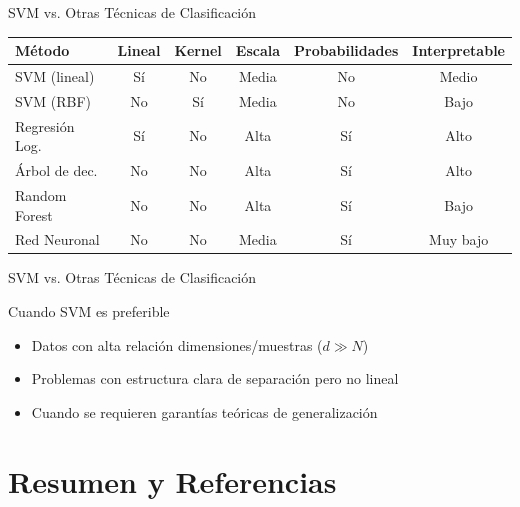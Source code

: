 \documentclass[aspectratio=169,xcolor=dvipsnames]{beamer}
\begin{document}
\begin{frame}{SVM vs. Otras Técnicas de Clasificación}
    \begin{center}
    \begin{tabular}{lccccc}
        \toprule
        \textbf{Método} & \textbf{Lineal} & \textbf{Kernel} & \textbf{Escala} & \textbf{Probabilidades} & \textbf{Interpretable} \\
        \midrule
        SVM (lineal)    & Sí & No  & Media  & No  & Medio \\
        SVM (RBF)       & No & Sí  & Media  & No  & Bajo \\
        Regresión Log.  & Sí & No  & Alta   & Sí  & Alto \\
        Árbol de dec.   & No & No  & Alta   & Sí  & Alto \\
        Random Forest   & No & No  & Alta   & Sí  & Bajo \\
        Red Neuronal    & No & No  & Media  & Sí  & Muy bajo \\
        \bottomrule
    \end{tabular}
    \end{center}
\end{frame}
\begin{frame}{SVM vs. Otras Técnicas de Clasificación}

    \begin{exampleblock}{Cuando SVM es preferible}
        \begin{itemize}
            \item Datos con alta relación dimensiones/muestras ($d \gg N$)
            \item Problemas con estructura clara de separación pero no lineal
            \item Cuando se requieren garantías teóricas de generalización
        \end{itemize}
    \end{exampleblock}
\end{frame}

\section{Resumen y Referencias}
\end{document}
